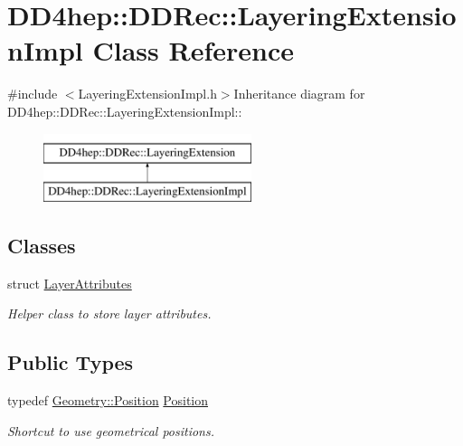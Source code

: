 \hypertarget{class_d_d4hep_1_1_d_d_rec_1_1_layering_extension_impl}{
\section{DD4hep::DDRec::LayeringExtensionImpl Class Reference}
\label{class_d_d4hep_1_1_d_d_rec_1_1_layering_extension_impl}
}


{\ttfamily \#include $<$LayeringExtensionImpl.h$>$}Inheritance diagram for DD4hep::DDRec::LayeringExtensionImpl::\begin{figure}[H]
\begin{center}
\leavevmode
\includegraphics[height=2cm]{class_d_d4hep_1_1_d_d_rec_1_1_layering_extension_impl}
\end{center}
\end{figure}
\subsection*{Classes}
\begin{DoxyCompactItemize}
\item 
struct \hyperlink{struct_d_d4hep_1_1_d_d_rec_1_1_layering_extension_impl_1_1_layer_attributes}{LayerAttributes}
\begin{DoxyCompactList}\small\item\em Helper class to store layer attributes. \item\end{DoxyCompactList}\end{DoxyCompactItemize}
\subsection*{Public Types}
\begin{DoxyCompactItemize}
\item 
typedef \hyperlink{namespace_d_d4hep_1_1_geometry_a55083902099d03506c6db01b80404900}{Geometry::Position} \hyperlink{class_d_d4hep_1_1_d_d_rec_1_1_layering_extension_impl_a34281f7585bbe0d61654c9924e2789e3}{Position}
\begin{DoxyCompactList}\small\item\em Shortcut to use geometrical positions. \item\end{DoxyCompactList}\end{DoxyCompactItemize}
